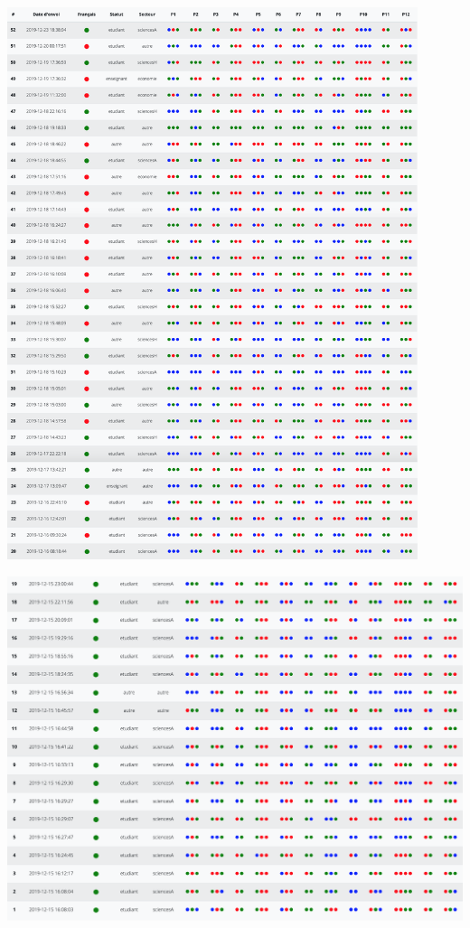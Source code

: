\documentclass[11pt,letterpaper]{article}
\begin{document}
\begin{center}
    \includegraphics[width=0.9\textwidth]{figures/reponses.png}
\end{center}

\newpage

\begin{center}
    \includegraphics[width=\textwidth]{figures/reponses2.png}
\end{center}



\end{document}
